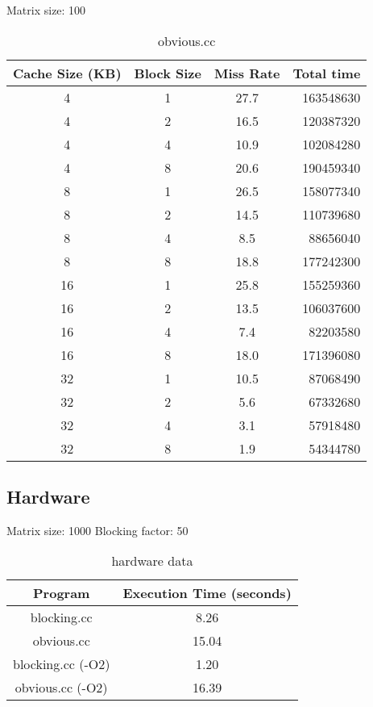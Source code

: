 \documentclass[letterpaper, 12pt, oneside]{memoir}
\begin{document}
Matrix size: 100
\begin{table}[H]
\centering
\begin{tabular}{c|c|c|r}
    Cache Size (KB)  & Block Size & Miss Rate & Total time \\ \hline 
    4  & 1 & 27.7   & 163548630 \\
    4  & 2 & 16.5   & 120387320 \\
    4  & 4 & 10.9   & 102084280 \\
    4  & 8 & 20.6   & 190459340 \\ \hline
    8  & 1 & 26.5   & 158077340 \\
    8  & 2 & 14.5   & 110739680 \\
    8  & 4 & 8.5    & 88656040 \\
    8  & 8 & 18.8   & 177242300 \\ \hline
    16 & 1 & 25.8   & 155259360 \\
    16 & 2 & 13.5   & 106037600 \\
    16 & 4 & 7.4    & 82203580 \\
    16 & 8 & 18.0   & 171396080 \\ \hline
    32 & 1 & 10.5   & 87068490 \\
    32 & 2 & 5.6    & 67332680 \\
    32 & 4 & 3.1    & 57918480 \\
    32 & 8 & 1.9    & 54344780 \\
\end{tabular}
\caption{obvious.cc}
\end{table}

\subsection{Hardware}

Matrix size: 1000
Blocking factor: 50
\begin{table}[H]
\centering
\begin{tabular}{c|c}
    Program & Execution Time (seconds) \\ \hline
    blocking.cc        & 8.26 \\
    obvious.cc         & 15.04 \\
    blocking.cc (-O2)  & 1.20 \\
    obvious.cc  (-O2)  & 16.39
\end{tabular}
\caption{hardware data}
\end{table}
\end{document}

